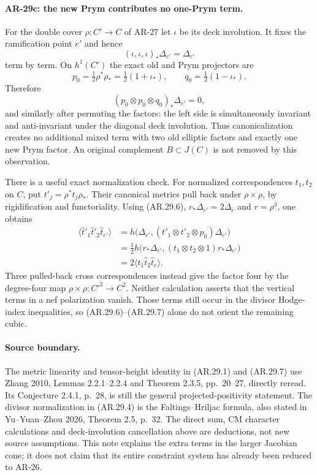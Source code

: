 \paragraph{AR-29c: the new Prym contributes no one-Prym term.}
For the double cover $\rho:C'\to C$ of AR-27 let $\iota$ be its
deck involution.  It fixes the ramification point $e'$ and hence
\[
 (\iota,\iota,\iota)_*\Delta_{e'}=\Delta_{e'}
\]
term by term.  On $h^1(C')$ the exact old and Prym projectors are
\[
 p_0=\tfrac12\rho^*\rho_*=\tfrac12(1+\iota_*),
 \qquad q_0=\tfrac12(1-\iota_*).
\]
Therefore
\[
 (p_0\otimes p_0\otimes q_0)_*\Delta_{e'}=0,           \tag{AR.29.6}
\]
and similarly after permuting the factors: the left side is
simultaneously invariant and anti-invariant under the diagonal
deck involution.  Thus canonicalization creates no additional
mixed term with two old elliptic factors and exactly one new
Prym factor.  An original complement $B\subset J(C)$ is not
removed by this observation.

There is a useful exact normalization check.  For normalized
correspondences $t_1,t_2$ on $C$, put
$t'_j=\rho^*t_j\rho_*$.  Their canonical metrics pull back under
$\rho\times\rho$, by rigidification and functoriality.  Using
(AR.29.6), $r_*\Delta_{e'}=2\Delta_e$ and $r=\rho^3$, one obtains
\[
 \begin{split}
 \langle\widehat t'_1\widehat t'_2\widehat t_{e'}\rangle
 &=h\bigl(\Delta_{e'},(t'_1\otimes t'_2\otimes p_0)
                                    \Delta_{e'}\bigr)\\
 &=\tfrac12 h\bigl(r_*\Delta_{e'},
                         (t_1\otimes t_2\otimes1)r_*\Delta_{e'}\bigr)\\
 &=2\langle\widehat t_1\widehat t_2\widehat t_e\rangle.
 \end{split}                                                    \tag{AR.29.7}
\]
Three pulled-back cross correspondences instead give the factor
four by the degree-four map $\rho\times\rho:C'^2\to C^2$.
Neither calculation asserts that the vertical terms in a nef
polarization vanish.  Those terms still occur in the divisor
Hodge-index inequalities, so (AR.29.6)--(AR.29.7) alone do not orient the
remaining cubic.

\paragraph{Source boundary.}
The metric linearity and tensor-height identity in (AR.29.1) and
(AR.29.7) use Zhang 2010, Lemmas 2.2.1--2.2.4 and Theorem 2.3.5,
pp.~20--27, directly reread.  Its Conjecture 2.4.1, p.~28, is
still the general projected-positivity statement.  The divisor
normalization in (AR.29.4) is the Faltings--Hriljac formula, also
stated in Yu--Yuan--Zhou 2026, Theorem 2.5, p.~32.  The direct
sum, CM character calculations and deck-involution cancellation
above are deductions, not new source assumptions.  This note
explains the extra terms in the larger Jacobian cone; it does
not claim that its entire constraint system has already been
reduced to AR-26.

